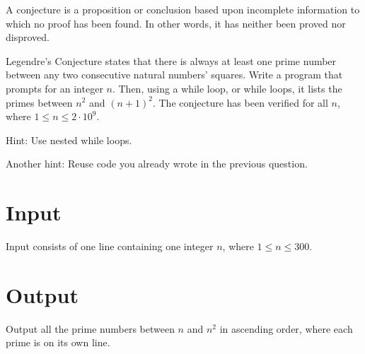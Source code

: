 
A conjecture is a proposition or conclusion based upon incomplete information to which no proof has been found.
In other words, it has neither been proved nor disproved.

Legendre's Conjecture states that there is always at least one prime number between any two consecutive natural numbers' squares.
Write a program that prompts for an integer $n$. Then, using a while loop, or while loops, it lists the primes between $n^2$ and $(n+1)^2$.
The conjecture has been verified for all $n$, where $1 \leq n \leq 2 \cdot 10^9$.

Hint: Use nested while loops.

Another hint: Reuse code you already wrote in the previous question.

\section*{Input}
Input consists of one line containing one integer $n$, where $1 \leq n \leq 300$.

\section*{Output}
Output all the prime numbers between $n$ and $n^2$ in ascending order, where each prime is on its own line.
